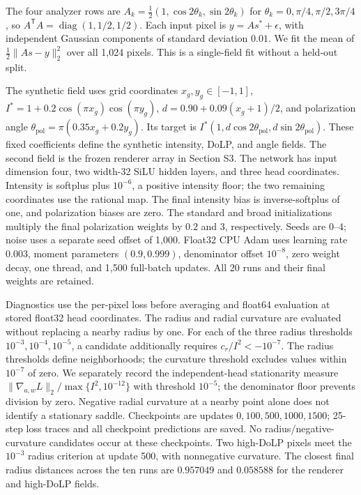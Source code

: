 The four analyzer rows are $A_k=\tfrac12(1,\cos2\theta_k,\sin2\theta_k)$ for $\theta_k=0,\pi/4,\pi/2,3\pi/4$, so $A^{\mathsf T}A=\operatorname{diag}(1,1/2,1/2)$. Each input pixel is $y=As^*+\epsilon$, with independent Gaussian components of standard deviation $0.01$. We fit the mean of $\tfrac12\|As-y\|_2^2$ over all 1,024 pixels. This is a single-field fit without a held-out split.

The synthetic field uses grid coordinates $x_g,y_g\in[-1,1]$, $I^*=1+0.2\cos(\pi x_g)\cos(\pi y_g)$, $d=0.90+0.09(x_g+1)/2$, and polarization angle $\theta_{\mathrm{pol}}=\pi(0.35x_g+0.2y_g)$. Its target is $I^*(1,d\cos2\theta_{\mathrm{pol}},d\sin2\theta_{\mathrm{pol}})$. These fixed coefficients define the synthetic intensity, DoLP, and angle fields. The second field is the frozen renderer array in Section S3. The network has input dimension four, two width-32 SiLU hidden layers, and three head coordinates. Intensity is softplus plus $10^{-6}$, a positive intensity floor; the two remaining coordinates use the rational map. The final intensity bias is inverse-softplus of one, and polarization biases are zero. The standard and broad initializations multiply the final polarization weights by $0.2$ and $3$, respectively. Seeds are $0$--$4$; noise uses a separate seed offset of 1,000. Float32 CPU Adam uses learning rate $0.003$, moment parameters $(0.9,0.999)$, denominator offset $10^{-8}$, zero weight decay, one thread, and 1,500 full-batch updates. All 20 runs and their final weights are retained.

Diagnostics use the per-pixel loss before averaging and float64 evaluation at stored float32 head coordinates. The radius and radial curvature are evaluated without replacing a nearby radius by one. For each of the three radius thresholds $10^{-3},10^{-4},10^{-5}$, a candidate additionally requires $c_r/I^2<-10^{-7}$. The radius thresholds define neighborhoods; the curvature threshold excludes values within $10^{-7}$ of zero. We separately record the independent-head stationarity measure $\|\nabla_{a,w}L\|_2/\max\{I^2,10^{-12}\}$ with threshold $10^{-5}$; the denominator floor prevents division by zero. Negative radial curvature at a nearby point alone does not identify a stationary saddle. Checkpoints are updates $0,100,500,1000,1500$; 25-step loss traces and all checkpoint predictions are saved. No radius/negative-curvature candidates occur at these checkpoints. Two high-DoLP pixels meet the $10^{-3}$ radius criterion at update 500, with nonnegative curvature. The closest final radius distances across the ten runs are $0.957049$ and $0.058588$ for the renderer and high-DoLP fields.

